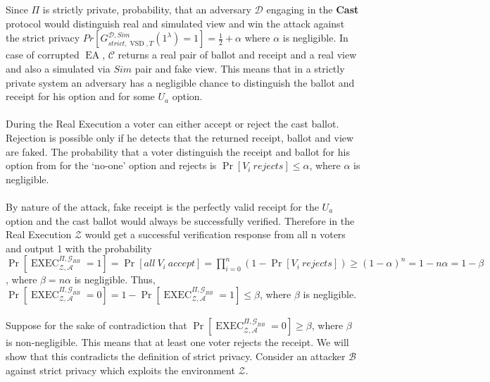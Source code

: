 \documentclass[12pt]{article}
\DeclareMathOperator{\exec}{EXEC}
\DeclareMathOperator{\vsd}{VSD}
\DeclareMathOperator{\ea}{EA}
\def\blockdist{2.3}
\begin{document}
\\\\
 Since $\Pi$ is strictly private, probability, that an adversary $\mathcal{D}$ engaging in the \textbf{Cast} protocol would distinguish real and simulated view and win the attack against the strict privacy $Pr[G_{strict,\vsd,T}^{\mathcal{D},Sim}(1^{\lambda}) = 1] = \frac{1}{2} + \alpha$ where $\alpha$ is negligible. In case of corrupted $\ea$, $\mathcal{C}$ returns a real pair of ballot and receipt and a real view and also a simulated via $Sim$ pair and fake view. This means that in a strictly private system an adversary has a negligible chance to distinguish the ballot and receipt for his option and for some $U_a$ option. \\\\
During the Real Execution a voter can either accept or reject the cast ballot. Rejection is possible only if he detects that the returned receipt, ballot and view are faked. The probability that a voter distinguish the receipt and ballot for his option from for the `no-one' option and rejects is $\Pr[V_i~rejects] \leq  \alpha$, where $\alpha$ is negligible.\\\\
 By nature of the attack,  fake receipt is the perfectly valid receipt for the $U_a$ option and the cast ballot would always be successfully verified. Therefore in the Real Execution $\mathcal{Z}$ would get a successful verification response from all n voters and output 1 with the probability $\Pr[\exec_{\mathcal{Z},\mathcal{A}}^{\Pi, \mathcal{G}_{BB}} = 1] =  \Pr[all~V_i~accept] = \prod_{i=0}^n(1- \Pr[V_i~rejects] ) \geq (1 - \alpha)^n = 1 - n\alpha = 1- \beta$, where $\beta = n\alpha $ is negligible. Thus, $\Pr[\exec_{\mathcal{Z},\mathcal{A}}^{\Pi, \mathcal{G}_{BB}} = 0] = 1 - \Pr[\exec_{\mathcal{Z},\mathcal{A}}^{\Pi, \mathcal{G}_{BB}} = 1] \leq \beta$, where $\beta$ is negligible.\\\\
Suppose for the sake of contradiction that $\Pr[\exec_{\mathcal{Z},\mathcal{A}}^{\Pi, \mathcal{G}_{BB}} = 0] \geq  \beta$, where $\beta$ is non-negligible. This means that at least one voter rejects the receipt. We will show that this contradicts the definition of strict privacy. Consider an attacker $\mathcal{B}$ against strict privacy which exploits the environment  $\mathcal{Z}$. \\\\
\end{document}

